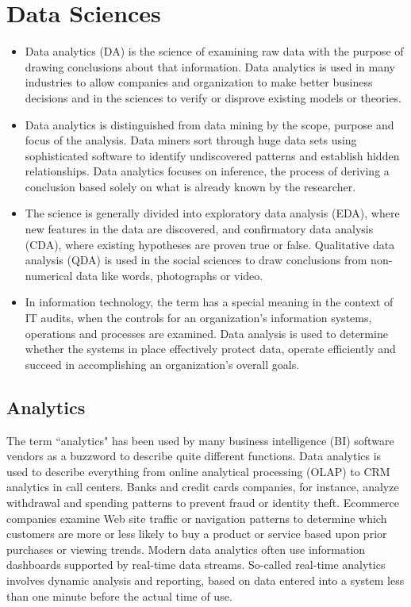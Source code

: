 \documentclass[a4paper,12pt]{article}
\begin{document}
  \medskip

\section*{Data Sciences}
\begin{itemize}
\item Data analytics (DA) is the science of examining raw data with the purpose of drawing conclusions about that information. Data analytics is used in many industries to allow companies and organization to make better business decisions and in the sciences to verify or disprove existing models or theories. 
\item Data analytics is distinguished from data mining by the scope, purpose and focus of the analysis. Data miners sort through huge data sets using sophisticated software to identify undiscovered patterns and establish hidden relationships. Data analytics focuses on inference, the process of deriving a conclusion based solely on what is already known by the researcher.

\item The science is generally divided into exploratory data analysis (EDA), where new features in the data are discovered, and confirmatory data analysis (CDA), where existing hypotheses are proven true or false. Qualitative data analysis (QDA) is used in the social sciences to draw conclusions from non-numerical data like words, photographs or video. 
\item In information technology, the term has a special meaning in the context of IT audits, when the controls for an organization's information systems, operations and processes are examined. Data analysis is used to determine whether the systems in place effectively protect data, operate efficiently and succeed in accomplishing an organization's overall goals.
\end{itemize}
    \subsection*{ Analytics }

The term ``analytics" has been used by many business intelligence (BI) software vendors as a buzzword to describe quite different functions. Data analytics is used to describe everything from online analytical processing (OLAP) to CRM analytics in call centers. Banks and credit cards companies, for instance, analyze withdrawal and spending patterns to prevent fraud or identity theft. Ecommerce companies examine Web site traffic or navigation patterns to determine which customers are more or less likely to buy a product or service based upon prior purchases or viewing trends. Modern data analytics often use information dashboards supported by real-time data streams. So-called real-time analytics involves dynamic analysis and reporting, based on data entered into a system less than one minute before the actual time of use.
\end{document}
